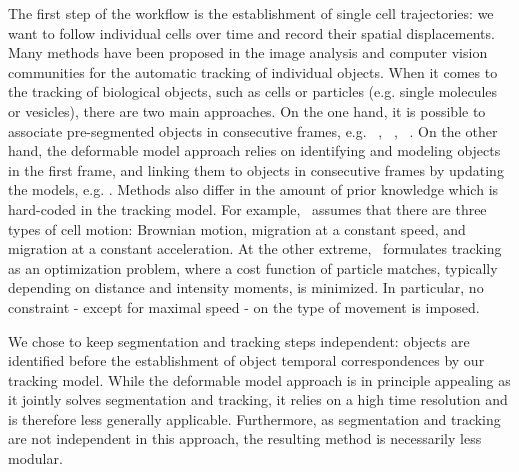 %
The first step of the workflow is the establishment of single cell
trajectories: we want to follow individual cells over time and record
their spatial displacements. Many methods have been proposed in the
image analysis and computer vision communities for the automatic
tracking of individual objects. When it comes to the tracking of
biological objects, such as cells or particles (e.g.
single molecules or vesicles), there are two main approaches. On the one hand, it is possible to associate pre-segmented objects in consecutive frames, e.g. ~\cite{lou},
~\cite{citeulike:11229467}, ~\cite{Chenouard2014}. %
On the other hand, the deformable model approach relies on identifying and modeling objects in the first frame, and linking them to objects in consecutive frames by updating the models, e.g. \cite{pmid12585703}. Methods also differ in the amount of prior knowledge which is hard-coded in the tracking model. For example,~\cite{pmid18656418} assumes that there are three types of
cell motion: Brownian motion, migration at a constant speed, and
migration at a constant acceleration. At the other
extreme,~\cite{pmid16043363} formulates tracking as an optimization
problem, where a cost function of particle matches, typically depending on distance and
intensity moments, is minimized.  
In particular, no constraint - except for maximal speed - on
the type of movement is imposed. 

We chose to keep segmentation and tracking steps independent: objects are identified before the establishment of object temporal correspondences by our tracking model. While the deformable model approach is in principle appealing as it jointly solves segmentation and tracking, it relies on a high time resolution and is therefore less generally applicable. Furthermore, as segmentation and tracking are not independent in this approach,
the resulting method is necessarily less modular.  

